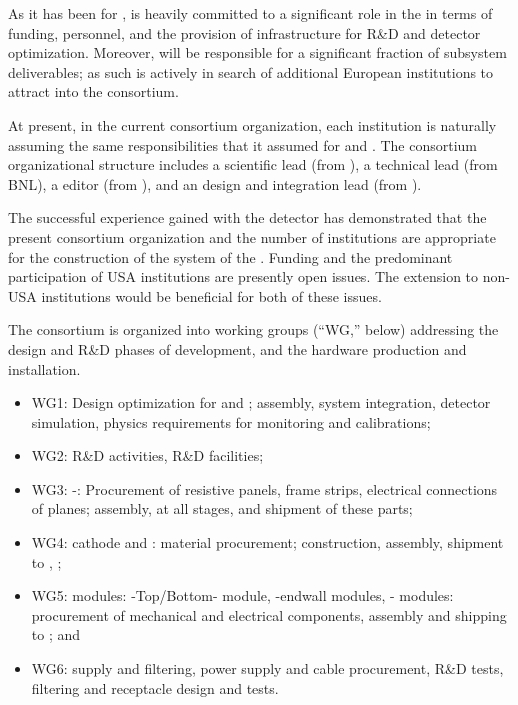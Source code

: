   
 As it has been %
for ,  is heavily committed to a significant role in the   in terms of funding, personnel, 
 and the provision of infrastructure for R\&D and detector optimization. Moreover,  will be responsible for a significant fraction of subsystem deliverables; as such   is actively in search of additional European institutions to attract into the consortium. 
 
At present, in the  current consortium organization, each institution is naturally assuming the same responsibilities that it assumed for %
 and . The %
consortium organizational structure includes a scientific lead (from ), a technical lead (from BNL), a  editor (from ), and an  design and integration lead (from ). 

The successful experience gained with the  detector has demonstrated that the present  consortium organization and the number of institutions are appropriate for the construction of the  system of the . Funding and the predominant participation of USA institutions are presently open issues. The extension to non-USA institutions would be beneficial for both of these issues. 

 The consortium is organized into working groups (``WG,'' below) addressing the design and  R\&D phases of development, and the hardware production and installation.

\begin{itemize}
\item WG1: Design optimization for  and ; assembly, system integration, detector simulation, physics requirements for monitoring and calibrations; %
\item WG2: R\&D activities, R\&D facilities; %
\item WG3: -: Procurement of resistive panels, frame strips, electrical connections of planes; assembly,  at all stages, and shipment of these parts; \item WG4:  cathode and :  material procurement; construction, assembly, shipment to  %
, ; %
\item WG5:  modules: -Top/Bottom- module, -endwall modules, - modules: procurement of mechanical and electrical components, assembly and shipping to ; and  %
\item WG6:  supply and filtering,  power supply and cable procurement, R\&D tests, filtering and receptacle design and tests. %
\end{itemize}


